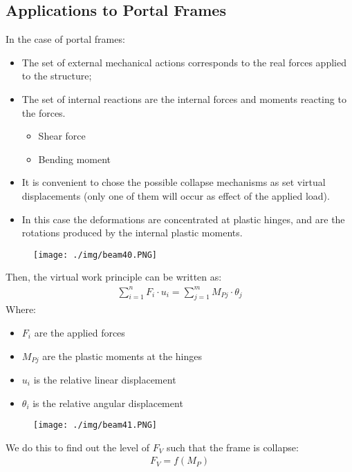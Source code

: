\subsection{Applications to Portal Frames}
In the case of portal frames:
\begin{itemize}
  \item The set of external mechanical actions corresponds to the real forces applied to the structure;
  \item The set of internal reactions are the internal forces and moments reacting to the forces.
        \begin{itemize}
          \item Shear force
          \item Bending moment
        \end{itemize}
  \item It is convenient to chose the possible collapse mechanisms as set virtual displacements (only one of them will occur as effect of the applied load).
  \item In this case the deformations are concentrated at plastic hinges, and are the rotations produced by the internal plastic moments.
\end{itemize}
\begin{figure}[H]
  \centering
  \texttt{[image: ./img/beam40.PNG]}
\end{figure}
Then, the virtual work principle can be written as:
\begin{gather}
  \sum_{i=1}^{n}F_i\cdot u_i = \sum_{j=1}^{m} M_{Pj}\cdot\theta_j
\end{gather}
Where:
\begin{itemize}
  \item $F_i$ are the applied forces
  \item $M_{Pj}$ are the plastic moments at the hinges
  \item $u_i$ is the relative linear displacement
  \item $\theta_i$ is the relative angular displacement
\end{itemize}
\begin{figure}[H]
  \centering
  \texttt{[image: ./img/beam41.PNG]}
\end{figure}
We do this to find out the level of $F_V$ such that the frame is collapse:
\begin{gather}
  F_V = f(M_P)
\end{gather}
